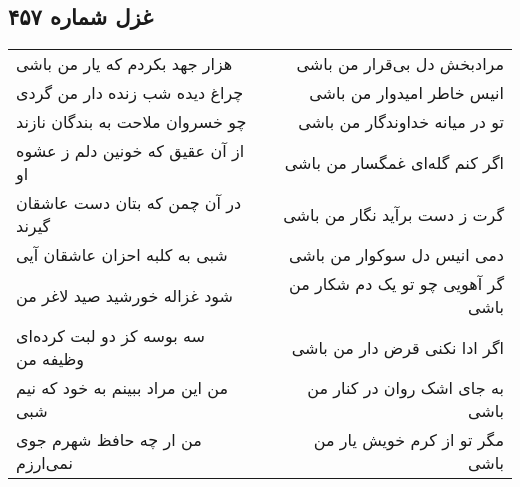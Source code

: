 \begin{center}
\section*{غزل شماره ۴۵۷}
\label{sec:sh457}
\begin{longtable}{l p{0.5cm} r}
هزار جهد بکردم که یار من باشی
&&
مرادبخش دل بی‌قرار من باشی
\\
چراغ دیده شب زنده دار من گردی
&&
انیس خاطر امیدوار من باشی
\\
چو خسروان ملاحت به بندگان نازند
&&
تو در میانه خداوندگار من باشی
\\
از آن عقیق که خونین دلم ز عشوه او
&&
اگر کنم گله‌ای غمگسار من باشی
\\
در آن چمن که بتان دست عاشقان گیرند
&&
گرت ز دست برآید نگار من باشی
\\
شبی به کلبه احزان عاشقان آیی
&&
دمی انیس دل سوکوار من باشی
\\
شود غزاله خورشید صید لاغر من
&&
گر آهویی چو تو یک دم شکار من باشی
\\
سه بوسه کز دو لبت کرده‌ای وظیفه من
&&
اگر ادا نکنی قرض دار من باشی
\\
من این مراد ببینم به خود که نیم شبی
&&
به جای اشک روان در کنار من باشی
\\
من ار چه حافظ شهرم جوی نمی‌ارزم
&&
مگر تو از کرم خویش یار من باشی
\\
\end{longtable}
\end{center}
